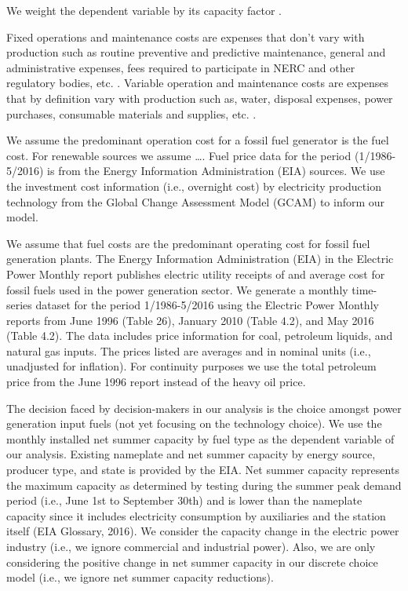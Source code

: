 \documentclass[10pt]{amsart}
\begin{document}
We weight the dependent variable by its capacity factor \parencite{eiapower2016,eiapower2014}.

Fixed operations and maintenance costs are expenses that don't vary with production such as routine preventive and predictive maintenance, general and administrative expenses, fees required to participate in NERC and other regulatory bodies, etc. \parencite{eiaupdatedcapital2010}.
Variable operation and maintenance costs are expenses that by definition vary with production such as, water, disposal expenses, power purchases, consumable materials and supplies, etc. \parencite{eiaupdatedcapital2010}.   

We assume the predominant operation cost for a fossil fuel generator is the fuel cost. 
For renewable sources we assume \ldots. 
Fuel price data for the period (1/1986-5/2016) is from the Energy Information Administration (EIA) sources.
We use the investment cost information (i.e., overnight cost) by electricity production technology from the Global Change Assessment Model (GCAM) to inform our model. 

We assume that fuel costs are the predominant operating cost for fossil fuel generation plants.
The Energy Information Administration (EIA) in the Electric Power Monthly report publishes electric utility receipts of and average cost for fossil fuels used in the power generation sector.
We generate a monthly time-series dataset for the period 1/1986-5/2016 using the Electric Power Monthly reports from June 1996 (Table 26), January 2010 (Table 4.2), and May 2016 (Table 4.2). 
The data includes price information for coal, petroleum liquids, and natural gas inputs.
The prices listed are averages and in nominal units (i.e., unadjusted for inflation).
For continuity purposes we use the total petroleum price from the June 1996 report instead of the heavy oil price.  

The decision faced by decision-makers in our analysis is the choice amongst power generation input fuels (not yet focusing on the technology choice). 
We use the monthly installed net summer capacity by fuel type as the dependent variable of our analysis. 
Existing nameplate and net summer capacity by energy source, producer type, and state is provided by the EIA.
Net summer capacity represents the maximum capacity as determined by testing during the summer peak demand period (i.e., June 1st to September 30th) and is lower than the nameplate capacity since it includes electricity consumption by auxiliaries and the station itself \parencite{}(EIA Glossary, 2016). 
We consider the capacity change in the electric power industry (i.e., we ignore commercial and industrial power).  
Also, we are only considering the positive change in net summer capacity in our discrete choice model (i.e., we ignore net summer capacity reductions). 
\end{document}
